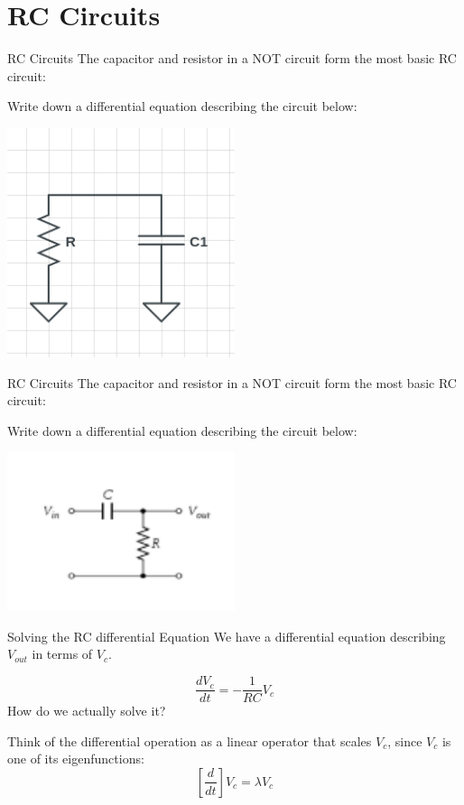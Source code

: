 \section{RC Circuits}

\begin{frame}{RC Circuits}
    The capacitor and resistor in a NOT circuit form the most basic RC circuit:
    
    Write down a differential equation describing the circuit below:
	\begin{center}
	    \includegraphics[width=0.5\textwidth]{./images/rc-circuits-1.png}
	\end{center}
\end{frame}

\begin{frame}{RC Circuits}
    The capacitor and resistor in a NOT circuit form the most basic RC circuit:
    
    Write down a differential equation describing the circuit below:
	\begin{center}
	    \includegraphics[width=0.5\textwidth]{./images/rc-circuits-2.png}
	\end{center}
\end{frame}

\begin{frame}{Solving the RC differential Equation}
    We have a differential equation describing $V_{out}$ in terms of \(V_c\).

    \[
        \frac{dV_c}{dt} = -\frac{1}{RC} V_c
    \]
    How do we actually solve it?

    \pause
    
    Think of the differential operation as a linear operator that scales $V_c$, since $V_c$ is one of its eigenfunctions:
	\[[\frac{d}{dt}]V_c = \lambda{V_c}\]
\end{frame}


